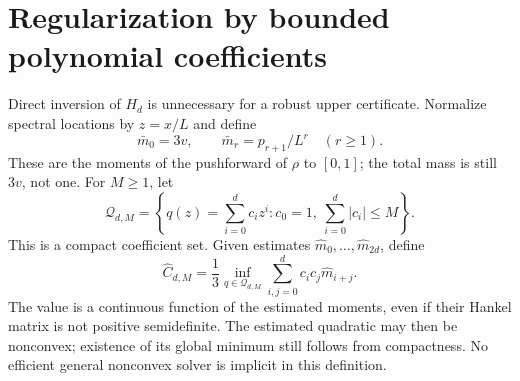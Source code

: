 \documentclass[11pt,letterpaper]{article}
\numberwithin{equation}{section}
\theoremstyle{definition}
\theoremstyle{remark}
\begin{document}
\section{Regularization by bounded polynomial coefficients}
\label{sec:regularization}

Direct inversion of $H_d$ is unnecessary for a robust upper certificate.
Normalize spectral locations by $z=x/L$ and define
\begin{equation}
 \bar m_0=3v,\qquad
 \bar m_r=p_{r+1}/L^r\quad(r\ge1).
 \label{eq:normalizedmoments}
\end{equation}
These are the moments of the pushforward of $\rho$ to $[0,1]$; the total
mass is still $3v$, not one.
For $M\ge1$, let
\begin{equation}
 \mathcal Q_{d,M}=
 \left\{q(z)=\sum_{i=0}^d c_iz^i:
 c_0=1,\ \sum_{i=0}^d|c_i|\le M\right\}.
 \label{eq:coeffball}
\end{equation}
This is a compact coefficient set.
Given estimates $\widehat m_0,\ldots,\widehat m_{2d}$, define
\begin{equation}
 \widehat C_{d,M}=\frac13\inf_{q\in\mathcal Q_{d,M}}
       \sum_{i,j=0}^d c_ic_j\widehat m_{i+j}.
 \label{eq:regularized}
\end{equation}
The value is a continuous function of the estimated moments, even if their
Hankel matrix is not positive semidefinite. The estimated quadratic may then
be nonconvex; existence of its global minimum still follows from compactness.
No efficient general nonconvex solver is implicit in this definition.
\end{document}
